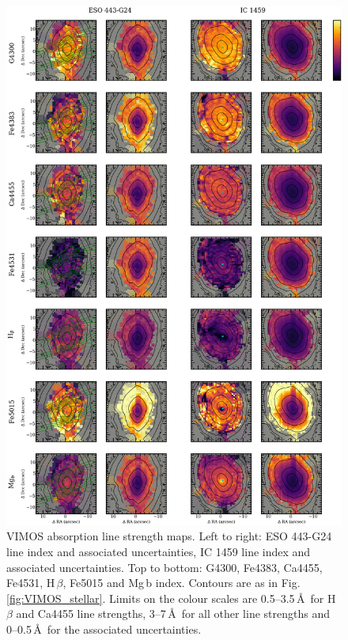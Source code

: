 		\begin{figure}
			\centering
			\includegraphics[height=0.94\textheight]{chapter4/vimos/abs1.png}
			\caption[VIMOS absorption line strength maps]{VIMOS absorption line strength maps. Left to right: ESO 443-G24 line index and associated uncertainties, IC 1459 line index and associated uncertainties. Top to bottom: G4300, Fe4383, Ca4455, Fe4531, H\,$\beta$, Fe5015 and Mg\,b index. Contours are as in Fig.\,\ref{fig:VIMOS_stellar}. Limits on the colour scales are 0.5--3.5\,\AA\ for H\,$\beta$ and Ca4455 line strengths, 3--7\,\AA\ for all other line strengths and 0--0.5\,\AA\ for the associated uncertainties.}
			\label{fig:VIMOS_absorption}
		\end{figure}
